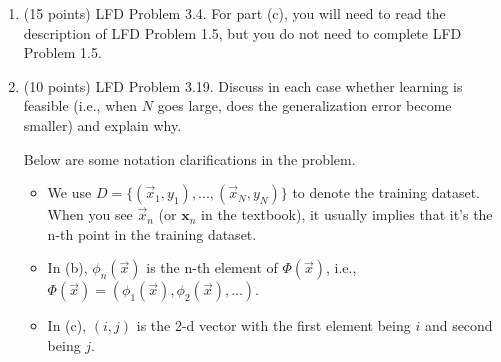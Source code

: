 \documentclass[11pt]{article}
\begin{document}
\begin{enumerate}

\item (15 points) LFD Problem 3.4. For part (c), you will need to read the description of LFD Problem 1.5, but you do not need to complete LFD Problem 1.5.

\item (10 points) LFD Problem 3.19. Discuss in each case whether learning is feasible (i.e., when $N$ goes large, does the generalization error become smaller) and explain why. 

Below are some notation clarifications in the problem.
\begin{itemize}
    \item We use $D=\{(\vec{x}_1,y_1),...,(\vec{x}_N,y_N)\}$ to denote the training dataset. When you see $\vec{x}_n$ (or $\bm{x}_n$ in the textbook), it usually implies that it's the n-th point in the training dataset.
    \item In (b), $\phi_n(\vec{x})$ is the n-th element of $\Phi(\vec{x})$, i.e., $\Phi(\vec{x})=(\phi_1(\vec{x}),\phi_2(\vec{x}),...)$.
    \item In (c), $(i,j)$ is the 2-d vector with the first element being $i$ and second being $j$.
\end{itemize}




\end{enumerate}
\end{document}

